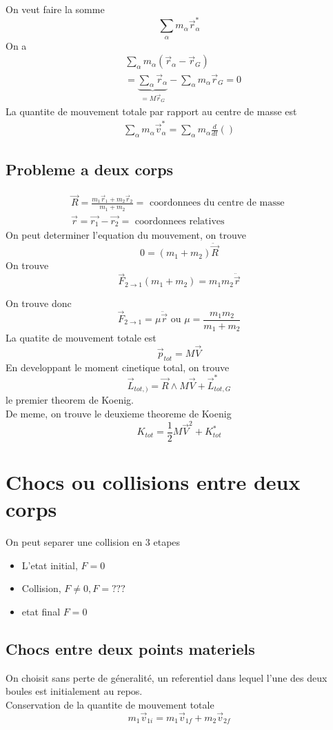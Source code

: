 \documentclass[../main.tex]{subfiles}
\begin{document}
On veut faire la somme
\[ 
\sum_{\alpha} m_\alpha \vec{r}_\alpha ^{*}
\]
On a 
\begin{align*}
	&\sum_\alpha m_\alpha( \vec{r}_\alpha - \vec{r}_G) \\
	&= \underbrace{\sum_{\alpha} \vec{r}_\alpha}_{=M\vec{r}_G} - \sum_\alpha m_\alpha \vec{r}_G =0
\end{align*}
La quantite de mouvement totale par rapport au centre de masse est
\begin{align*}
	\sum_{\alpha} m_\alpha \vec{v}_{\alpha} ^{*} = \sum_{\alpha} m_\alpha \frac{d}{dt} \left( \right) 
\end{align*}
\subsection{Probleme a deux corps}
\begin{align*}
\vec{R} = \frac{m_1 \vec{r}_1 +m_2\vec{r}_2}{m_1+m_2} = \text{ coordonnees du centre de masse } \\
\vec{r}= \vec{r_1} - \vec{r_2} = \text{ coordonnees relatives } 
\end{align*}
On peut determiner l'equation du mouvement, on trouve
\[ 
	0 = ( m_1+m_2) \ddot{\vec{R}}
\]
On trouve
\[ 
	\vec{F}_{2\to 1} ( m_1+m_2) = m_1m_2 \ddot{\vec{r}}
\]

On trouve donc
\[ 
\vec{F}_{2\to 1} = \mu \ddot{ \vec{r} } \text{ ou } \mu= \frac{m_1m_2}{m_1+m_2}
\]
La quatite de mouvement totale est
\[ 
\vec{p}_{tot} = M \vec{V}
\]
En developpant le moment cinetique total, on trouve
\[ 
	\vec{L}_{tot,)} = \vec{R} \land M \vec{V} + \vec{L}_{tot,G} ^{*}
\]
le premier theorem de Koenig.\\
De meme, on trouve le deuxieme theoreme de Koenig
\[ 
K_{tot} = \frac{1}{2}M \vec{V}^{2} + K_{tot} ^{*}
\]

\section{Chocs ou collisions entre deux corps}
On peut separer une collision en 3 etapes
\begin{itemize}
\item L'etat initial, $F=0$ 
\item Collision, $F\neq 0, F= ???$ 
\item etat final $F=0$
\end{itemize}
\subsection{Chocs entre deux points materiels}
On choisit sans perte de géneralité, un referentiel dans lequel l'une des deux boules est initialement au repos.\\
Conservation de la quantite de mouvement totale
\[ 
m_1 \vec{v}_{1i} = m_1 \vec{v}_{1f}  + m_2 \vec{v}_{2f} 
\]
\end{document}
